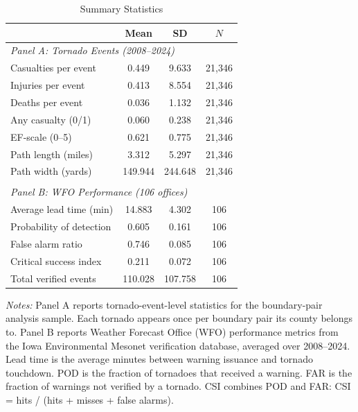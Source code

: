 \begin{table}[t]
\centering
\caption{Summary Statistics}
\label{tab:summary}
\begin{tabular}{lccc}
\hline\hline
& Mean & SD & $N$ \\
\hline
\multicolumn{4}{l}{\textit{Panel A: Tornado Events (2008--2024)}} \\[3pt]
Casualties per event & 0.449 & 9.633 & 21,346 \\
Injuries per event & 0.413 & 8.554 & 21,346 \\
Deaths per event & 0.036 & 1.132 & 21,346 \\
Any casualty (0/1) & 0.060 & 0.238 & 21,346 \\
EF-scale (0--5) & 0.621 & 0.775 & 21,346 \\
Path length (miles) & 3.312 & 5.297 & 21,346 \\
Path width (yards) & 149.944 & 244.648 & 21,346 \\
\\
\multicolumn{4}{l}{\textit{Panel B: WFO Performance (106 offices)}} \\[3pt]
Average lead time (min) & 14.883 & 4.302 & 106 \\
Probability of detection & 0.605 & 0.161 & 106 \\
False alarm ratio & 0.746 & 0.085 & 106 \\
Critical success index & 0.211 & 0.072 & 106 \\
Total verified events & 110.028 & 107.758 & 106 \\
\hline\hline
\end{tabular}
\begin{tablenotes}[flushleft]\small
\item \textit{Notes:} Panel A reports tornado-event-level statistics for the boundary-pair analysis sample.
Each tornado appears once per boundary pair its county belongs to.
Panel B reports Weather Forecast Office (WFO) performance metrics from the Iowa Environmental Mesonet
verification database, averaged over 2008--2024. Lead time is the average minutes between warning issuance
and tornado touchdown. POD is the fraction of tornadoes that received a warning. FAR is the fraction of
warnings not verified by a tornado. CSI combines POD and FAR: CSI = hits / (hits + misses + false alarms).
\end{tablenotes}
\end{table}
